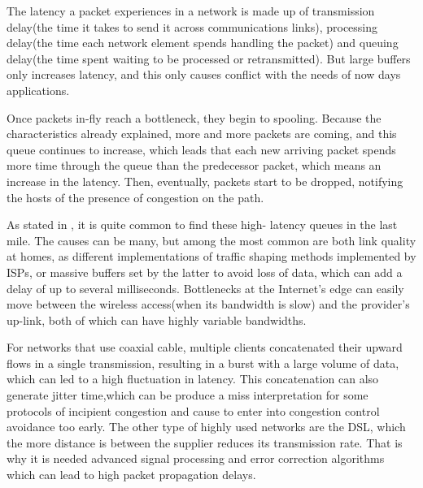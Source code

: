 The latency a packet experiences in a network is made up of transmission
delay(the time it takes to send it across communications links), processing
delay(the time each network element spends handling the packet) and queuing
delay(the time spent waiting to be processed or retransmitted). But large
buffers only increases latency, and this only causes conflict with the needs
of now days applications.

Once packets in-fly reach a bottleneck, they begin to spooling. Because the
characteristics already explained, more and more packets are coming, and this
queue continues to increase, which leads that each new arriving packet spends
more time through the queue than the predecessor packet, which means an
increase in the latency. Then, eventually, packets start to be dropped,
notifying the hosts of the presence of congestion on the path.

As stated in \cite{Dischinger2007CRB}, it is quite common to find these high-
latency queues in the last mile. The causes can be many, but among the most
common are both link quality at homes, as different implementations of traffic
shaping methods implemented by ISPs, or massive buffers set by the latter to
avoid loss of data, which can add a delay of up to several milliseconds.
Bottlenecks at the Internet's edge can easily move between the wireless
access(when its bandwidth is slow) and the provider's up-link, both of which
can have highly variable bandwidths.

For networks that use coaxial cable, multiple clients concatenated their
upward flows in a single transmission, resulting in a burst with a large
volume of data, which can led to a high fluctuation in latency. This
concatenation can also generate jitter time,which can be produce a miss
interpretation for some protocols of incipient congestion and cause to enter
into congestion control avoidance too early. The other type of highly used
networks are the DSL, which the more distance is between the supplier reduces
its transmission rate. That is why it is needed advanced signal processing and
error correction algorithms which can lead to high packet propagation delays.